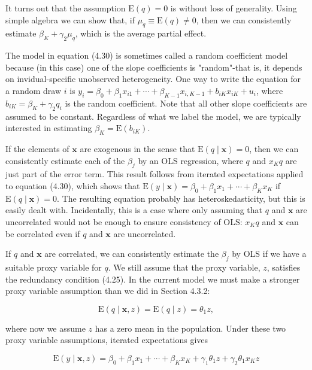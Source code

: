 \documentclass[10pt]{article}
\begin{document}
It turns out that the assumption $\mathrm{E}(q)=0$ is without loss of generality. Using simple algebra we can show that, if $\mu_{q} \equiv \mathrm{E}(q) \neq 0$, then we can consistently estimate $\beta_{K}+\gamma_{2} \mu_{q}$, which is the average partial effect.

The model in equation (4.30) is sometimes called a random coefficient model because (in this case) one of the slope coefficients is "random"-that is, it depends on invidual-specific unobserved heterogeneity. One way to write the equation for a random draw $i$ is $y_{i}=\beta_{0}+\beta_{1} x_{i 1}+\cdots+\beta_{K-1} x_{i, K-1}+b_{i K} x_{i K}+u_{i}$, where $b_{i K}=\beta_{K}+ \gamma_{2} q_{i}$ is the random coefficient. Note that all other slope coefficients are assumed to be constant. Regardless of what we label the model, we are typically interested in estimating $\beta_{K}=\mathrm{E}\left(b_{i K}\right)$.

If the elements of $\mathbf{x}$ are exogenous in the sense that $\mathrm{E}(q \mid \mathbf{x})=0$, then we can consistently estimate each of the $\beta_{j}$ by an OLS regression, where $q$ and $x_{K} q$ are just part of the error term. This result follows from iterated expectations applied to equation (4.30), which shows that $\mathrm{E}(y \mid \mathbf{x})=\beta_{0}+\beta_{1} x_{1}+\cdots+\beta_{K} x_{K}$ if $\mathrm{E}(q \mid \mathbf{x})=0$. The resulting equation probably has heteroskedasticity, but this is easily dealt with. Incidentally, this is a case where only assuming that $q$ and $\mathbf{x}$ are uncorrelated would not be enough to ensure consistency of OLS: $x_{K} q$ and $\mathbf{x}$ can be correlated even if $q$ and $\mathbf{x}$ are uncorrelated.

If $q$ and $\mathbf{x}$ are correlated, we can consistently estimate the $\beta_{j}$ by OLS if we have a suitable proxy variable for $q$. We still assume that the proxy variable, $z$, satisfies the redundancy condition (4.25). In the current model we must make a stronger proxy variable assumption than we did in Section 4.3.2:


\begin{equation*}
\mathrm{E}(q \mid \mathbf{x}, z)=\mathrm{E}(q \mid z)=\theta_{1} z, \tag{4.34}
\end{equation*}


where now we assume $z$ has a zero mean in the population. Under these two proxy variable assumptions, iterated expectations gives


\begin{equation*}
\mathrm{E}(y \mid \mathbf{x}, z)=\beta_{0}+\beta_{1} x_{1}+\cdots+\beta_{K} x_{K}+\gamma_{1} \theta_{1} z+\gamma_{2} \theta_{1} x_{K} z \tag{4.35}
\end{equation*}
\end{document}
